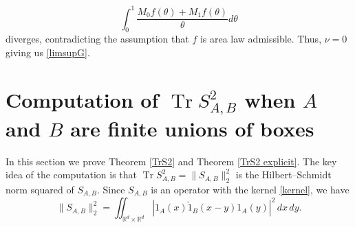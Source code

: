 \documentclass[12pt]{amsart}
\numberwithin{equation}{section}
\newcommand{\R}{\mathbb{R}}
\begin{document}
$$\int_0^1 \frac{M_0f(\theta)+M_1f(\theta)}{\theta}d\theta$$
diverges, contradicting the assumption that $f$ is area law admissible. Thus, $\nu = 0$ giving us \eqref{limsupG}.

\section{Computation of $\operatorname{Tr} S_{A,B}^2$ when $A$ and $B$ are finite unions of boxes}
In this section we prove Theorem \ref{TrS2} and Theorem \ref{TrS2 explicit}. The key idea of the computation is that $\operatorname{Tr} S_{A,B}^2 = \|S_{A,B}\|_{2}^2$ is the Hilbert--Schmidt norm squared of $S_{A,B}$. Since $S_{A,B}$ is an operator with the kernel \eqref{kernel}, we have
$$\|S_{A,B}\|_2^2 = \iint_{\R^d\times \R^d}|1_{A}(x) \check{1}_B(x-y) 1_A(y)|^2\,dx\, dy.$$
\end{document}
